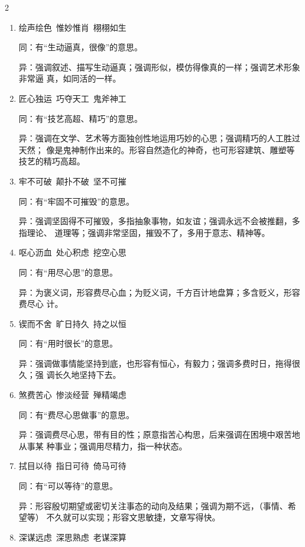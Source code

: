 \documentclass[final,oneside]{ctexbook}
\begin{document}
\begin{multicols}{2}
\begin{enumerate}
    \item 绘声绘色~惟妙惟肖~栩栩如生

      同：有“生动逼真，很像”的意思。

      异：强调叙述、描写生动逼真；强调形似，模仿得像真的一样；强调艺术形象非常逼
      真，如同活的一样。

    \item 匠心独运~巧夺天工~鬼斧神工

      同：有“技艺高超、精巧”的意思。

      异：强调在文学、艺术等方面独创性地运用巧妙的心思；强调精巧的人工胜过天然；
      像是鬼神制作出来的。形容自然造化的神奇，也可形容建筑、雕塑等技艺的精巧高超。

    \item 牢不可破~颠扑不破~坚不可摧

      同：有“牢固不可摧毁”的意思。

      异：强调坚固得不可摧毁，多指抽象事物，如友谊；强调永远不会被推翻，多指理论、
      道理等；强调非常坚固，摧毁不了，多用于意志、精神等。

    \item 呕心沥血~处心积虑~挖空心思

      同：有“用尽心思”的意思。

      异：为褒义词，形容费尽心血；为贬义词，千方百计地盘算；多含贬义，形容费尽心
      计。

    \item 锲而不舍~旷日持久~持之以恒

      同：有“用时很长”的意思。

      异：强调做事情能坚持到底，也形容有恒心，有毅力；强调多费时日，拖得很久；强
      调长久地坚持下去。

    \item 煞费苦心~惨淡经营~殚精竭虑

      同：有“费尽心思做事”的意思。

      异：强调费尽心思，带有目的性；原意指苦心构思，后来强调在困境中艰苦地从事某
      种事业；强调用尽精力，指一种状态。

    \item 拭目以待~指日可待~倚马可待

      同：有“可以等待”的意思。

      异：形容殷切期望或密切关注事态的动向及结果；强调为期不远，（事情、希望等）
      不久就可以实现；形容文思敏捷，文章写得快。

    \item 深谋远虑~深思熟虑~老谋深算


\end{enumerate}
\end{multicols}
\end{document}
